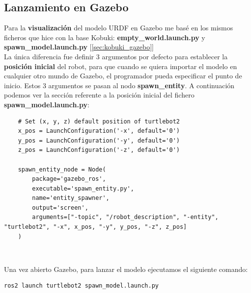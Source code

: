 \subsection{Lanzamiento en Gazebo}
\label{sec:turtlebot2_gazebo}

Para la \textbf{visualización} del modelo URDF en Gazebo me basé en los mismos ficheros que hice con la base Kobuki: \textbf{empty\_world.launch.py} y \textbf{spawn\_model.launch.py} [\ref{sec:kobuki_gazebo}]\\

La única diferencia fue definir 3 argumentos por defecto para establecer la \textbf{posición inicial} del robot, para que cuando se quiera importar el modelo en cualquier otro mundo de Gazebo, el programador pueda especificar el punto de inicio. Estos 3 argumentos se pasan al nodo \textbf{spawn\_entity}. A continuación podemos ver la sección referente a la posición inicial del fichero \textbf{spawn\_model.launch.py}:\\
\begin{lstlisting}
	# Set (x, y, z) default position of turtlebot2
	x_pos = LaunchConfiguration('-x', default='0')
	y_pos = LaunchConfiguration('-y', default='0')
	z_pos = LaunchConfiguration('-z', default='0')
	
	spawn_entity_node = Node(
		package='gazebo_ros',
		executable='spawn_entity.py',
		name='entity_spawner',
		output='screen',
		arguments=["-topic", "/robot_description", "-entity", "turtlebot2", "-x", x_pos, "-y", y_pos, "-z", z_pos]
	)
\end{lstlisting}\

Una vez abierto Gazebo, para lanzar el modelo ejecutamos el siguiente comando:\\
\begin{lstlisting}
ros2 launch turtlebot2 spawn_model.launch.py
\end{lstlisting}\

